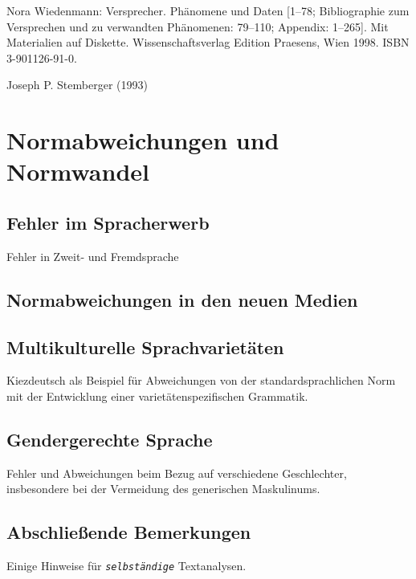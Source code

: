 \documentclass[
  letterpaper,
]{scrbook}
\begin{document}
Nora Wiedenmann: Versprecher. Phänomene und Daten {[}1--78;
Bibliographie zum Versprechen und zu verwandten Phänomenen: 79--110;
Appendix: 1--265{]}. Mit Materialien auf Diskette. Wissenschaftsverlag
Edition Praesens, Wien 1998. ISBN 3-901126-91-0.

Joseph P. Stemberger (1993)

\part{Normabweichungen und Normwandel}

\hypertarget{sec-spracherwerb}{%
\chapter{Fehler im Spracherwerb}\label{sec-spracherwerb}}

Fehler in Zweit- und Fremdsprache

\hypertarget{sec-medien}{%
\chapter{Normabweichungen in den neuen Medien}\label{sec-medien}}

\hypertarget{sec-multikulti}{%
\chapter{Multikulturelle Sprachvarietäten}\label{sec-multikulti}}

Kiezdeutsch als Beispiel für Abweichungen von der standardsprachlichen
Norm mit der Entwicklung einer varietätenspezifischen Grammatik.

\hypertarget{sec-gender}{%
\chapter{Gendergerechte Sprache}\label{sec-gender}}

Fehler und Abweichungen beim Bezug auf verschiedene Geschlechter,
insbesondere bei der Vermeidung des generischen Maskulinums.


\hypertarget{abschlieuxdfende-bemerkungen}{%
\chapter{Abschließende Bemerkungen}\label{abschlieuxdfende-bemerkungen}}

Einige Hinweise für \emph{\texttt{selbständige}} Textanalysen. 🤗
\end{document}
